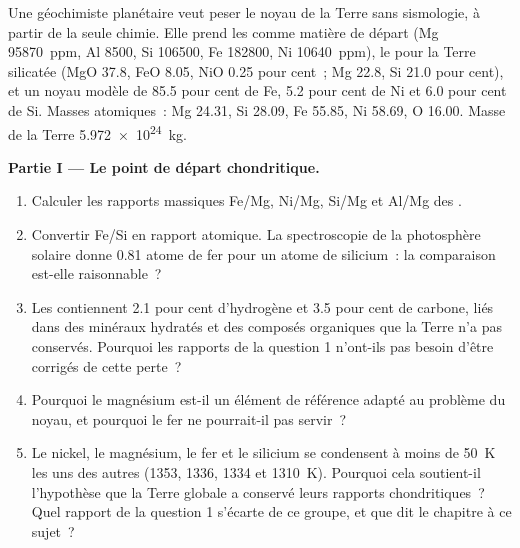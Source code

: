 \begin{problem}
\label{pb:b2:elements-in-the-earth:1}
Une géochimiste planétaire veut peser le noyau de la Terre sans sismologie,
à partir de la seule chimie. Elle prend les  comme
matière de départ (Mg \qty{95870}{ppm}, Al 8500, Si \num{106500}, Fe
\num{182800}, Ni \qty{10640}{ppm}), le  pour la Terre
silicatée (MgO 37.8, FeO 8.05, NiO 0.25 pour cent~; Mg 22.8, Si 21.0
pour cent), et un noyau modèle de 85.5 pour cent de Fe, 5.2 pour cent
de Ni et 6.0 pour cent de Si. Masses atomiques~: Mg 24.31, Si 28.09,
Fe 55.85, Ni 58.69, O 16.00. Masse de la Terre \qty{5.972e24}{kg}.

\medskip\noindent\textbf{Partie I --- Le point de départ chondritique.}
\begin{enumerate}
\item Calculer les rapports massiques Fe/Mg, Ni/Mg, Si/Mg et Al/Mg des .
\item Convertir Fe/Si en rapport atomique. La spectroscopie de la photosphère solaire donne 0.81 atome de fer
pour un atome de silicium~: la comparaison est-elle raisonnable~?
\item Les  contiennent 2.1 pour cent d'hydrogène et 3.5 pour cent de carbone,
liés dans des minéraux hydratés et des composés organiques que la Terre n'a pas conservés.
Pourquoi les rapports de la question 1 n'ont-ils pas besoin d'être corrigés de cette perte~?
\item Pourquoi le magnésium est-il un élément de référence adapté au problème du noyau,
et pourquoi le fer ne pourrait-il pas servir~?
\item Le nickel, le magnésium, le fer et le silicium se condensent à moins de \qty{50}{K} les uns des autres
(1353, 1336, 1334 et \qty{1310}{K}). Pourquoi cela soutient-il l'hypothèse que la Terre globale a conservé
leurs rapports chondritiques~? Quel rapport de la question 1 s'écarte de ce groupe, et que dit le chapitre
à ce sujet~?
\end{enumerate}


\end{problem}
